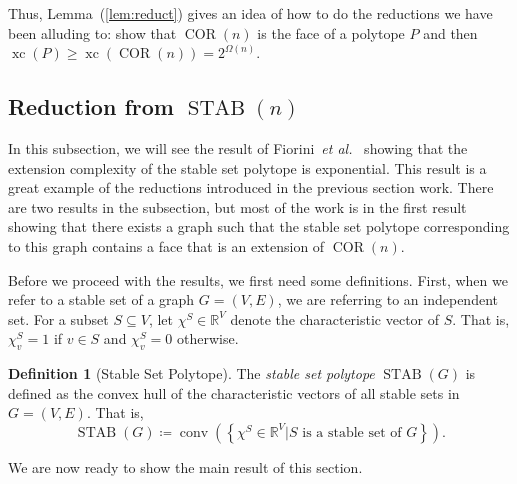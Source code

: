 \documentclass{article}
\makeatletter
\theoremstyle{definition}
\newtheorem{definition}[theorem]{Definition}
\theoremstyle{remark}
\newcommand{\cetal}{\textit{et al.\@}}  %
\newcommand{\conv}{\operatorname{conv}}
\newcommand{\xc}{\operatorname{xc}}
\newcommand{\STAB}{\operatorname{STAB}}
\newcommand{\COR}{\operatorname{COR}}
\renewcommand{\R}{\mathbb{R}}
\makeatother
\begin{document}
Thus, Lemma~(\ref{lem:reduct}) gives an idea of how to do the reductions we have been alluding to: show that $\COR(n)$ is the face of a polytope $P$ and then $\xc(P) \ge \xc(\COR(n)) =2^{\Omega(n)}$.


\subsection{Reduction from $\STAB(n)$}

In this subsection, we will see the result of Fiorini~\cetal~\cite{fiorini} showing that the extension complexity of the stable set polytope is exponential. This result is a great example of the reductions introduced in the previous section work. There are two results in the subsection, but most of the work is in the first result showing that there exists a graph such that the stable set polytope corresponding to this graph contains a face that is an extension of $\COR(n)$. 

Before we proceed with the results, we first need some definitions. First, when we refer to a stable set of a graph $G = (V,E)$, we are referring to an independent set. For a subset $S \subseteq V$, let $\chi^S \in \R^V$ denote the characteristic vector of $S$. That is, $\chi_v^S = 1$ if $v \in S$ and $\chi_v^S = 0$ otherwise. 

\begin{definition}[Stable Set Polytope]
The \emph{stable set polytope} $\STAB(G)$ is defined as the convex hull of the characteristic vectors of all stable sets in $G = (V, E)$. That is,
\[
\STAB(G) \coloneqq \conv\left(\left\{\chi^S \in \R^V | S \text{ is a stable set of $G$}\right\}\right).
\]
\end{definition}

We are now ready to show the main result of this section.
\end{document}
